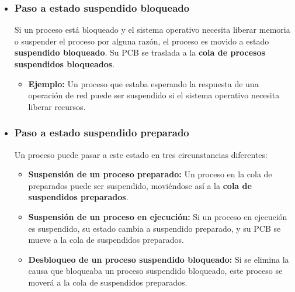 \begin{tcolorbox}


	\begin{itemize}
		
		
	
		
	
		

	

	
		
		\item \subsubsection {Paso a estado suspendido bloqueado}
		Si un proceso está bloqueado y el sistema operativo necesita liberar memoria o suspender el proceso por alguna razón, el proceso es movido a estado \textbf{suspendido bloqueado}. Su PCB se traslada a la \textbf{cola de procesos suspendidos bloqueados}.
		
		\begin{itemize}
			\item \textbf{Ejemplo:} Un proceso que estaba esperando la respuesta de una operación de red puede ser suspendido si el sistema operativo necesita liberar recursos. 
		\end{itemize}
		
			\item \subsubsection{Paso a estado suspendido preparado} 
		Un proceso puede pasar a este estado en tres circunstancias diferentes:
		
		\begin{itemize}
			\item \textbf{Suspensión de un proceso preparado:} Un proceso en la cola de preparados puede ser suspendido, moviéndose así a la \textbf{cola de suspendidos preparados}.
			\item \textbf{Suspensión de un proceso en ejecución:} Si un proceso en ejecución es suspendido, su estado cambia a suspendido preparado, y su PCB se mueve a la cola de suspendidos preparados.
			\item \textbf{Desbloqueo de un proceso suspendido bloqueado:} Si se elimina la causa que bloqueaba un proceso suspendido bloqueado, este proceso se moverá a la cola de suspendidos preparados.
		\end{itemize}
		
	\end{itemize}
\end{tcolorbox}





